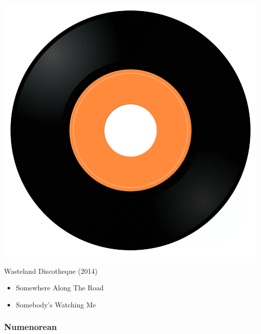 \begin{minipage}[t]{0.25\textwidth}\vspace{0pt}
\captionsetup{type=figure}
\includegraphics[width=\textwidth]{Images/cover.png}
\caption*{Wasteland Discotheque (2014)}
\end{minipage}
\begin{minipage}[t]{0.25\textwidth}\vspace{0pt}
\begin{itemize}[nosep,leftmargin=1em,labelwidth=*,align=left]
	\setlength{\itemsep}{0pt}
	\item Somewhere Along The Road
	\item Somebody's Watching Me
\end{itemize}
\end{minipage}


\subsubsection{Numenorean}

